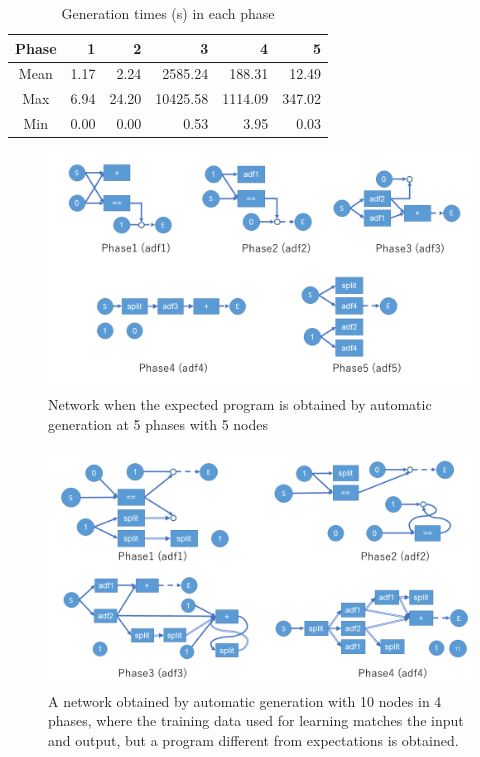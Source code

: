 \documentclass{article}
\begin{document}
\begin{table}[htbp]
\centering
\caption {Generation times (s) in each phase}
\label{tbl:result3}
\begin{tabular}{c|rrrrr}
    Phase &1&2&3&4&5\\
    \hline
    \hline
    Mean &1.17&2.24&2585.24&188.31&12.49\\
    Max &6.94&24.20&10425.58&1114.09&347.02\\
    Min &0.00&0.00&0.53&3.95&0.03\\
    \hline
\end{tabular}
\end{table}

\begin{figure}[t]
\begin{center}
\includegraphics[width=150mm]{out_net_p5n5.png}
\end{center}
\caption {Network when the expected program is obtained by automatic generation at 5 phases with 5 nodes}
\label{fig:out_net_p5n5}
\end{figure}
\begin{figure}[t]
\begin{center}
\includegraphics[width=150mm]{out_net_p4n10.png}
\end{center}
\caption {A network obtained by automatic generation with 10 nodes in 4 phases, where the training data used for learning matches the input and output, but a program different from expectations is obtained.}
\label{fig:out_net_p4n10}
\end{figure}
\end{document}
